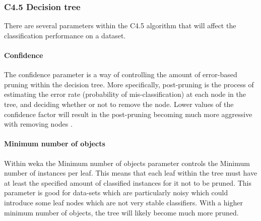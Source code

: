 \documentclass[12pt]{article}
\begin{document}
    \subsubsection{C4.5 Decision tree}
      There are several parameters within the C4.5 algorithm that will affect the classification performance on a dataset.


      \paragraph{Confidence}
        The confidence parameter is a way of controlling the amount of error-based pruning \citep{quinlan1987simplifying} within the decision tree. More specifically, post-pruning is the process of estimating the error rate (probability of mis-classification) at each node in the tree, and deciding whether or not to remove the node. Lower values of the confidence factor will result in the post-pruning becoming much more aggressive with removing nodes \citep{beck2008backward}.

      \paragraph{Minimum number of objects}
        Within weka the Minimum number of objects parameter controls the Minimum number of instances per leaf. This means that each leaf within the tree must have at least the specified amount of classified instances for it not to be pruned. This parameter is good for data-sets which are particularly noisy which could introduce some leaf nodes which are not very stable classifiers. With a higher minimum number of objects, the tree will likely become much more pruned.


\end{document}
